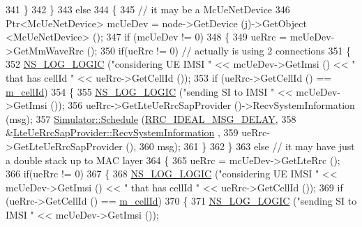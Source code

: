 \begin{DoxyCode}
341           \}             
342         \}
343         \textcolor{keywordflow}{else}
344         \{
345           \textcolor{comment}{// it may be a McUeNetDevice}
346           Ptr<McUeNetDevice> mcUeDev = node->GetDevice (j)->GetObject <McUeNetDevice> ();
347           \textcolor{keywordflow}{if} (mcUeDev != 0)
348           \{
349             ueRrc = mcUeDev->GetMmWaveRrc ();
350             \textcolor{keywordflow}{if}(ueRrc != 0) \textcolor{comment}{// actually is using 2 connections}
351             \{
352               \hyperlink{group__logging_ga88acd260151caf2db9c0fc84997f45ce}{NS\_LOG\_LOGIC} (\textcolor{stringliteral}{"considering UE IMSI "} << mcUeDev->GetImsi () << \textcolor{stringliteral}{" that has cellId 
      "} << ueRrc->GetCellId ());
353               \textcolor{keywordflow}{if} (ueRrc->GetCellId () == \hyperlink{classns3_1_1MmWaveEnbRrcProtocolIdeal_a12f3d627baf0e8dfe3b83ce9fcf7a2f3}{m\_cellId})
354               \{
355                 \hyperlink{group__logging_ga88acd260151caf2db9c0fc84997f45ce}{NS\_LOG\_LOGIC} (\textcolor{stringliteral}{"sending SI to IMSI "} << mcUeDev->GetImsi ());
356                 ueRrc->GetLteUeRrcSapProvider ()->RecvSystemInformation (msg);
357                 \hyperlink{classns3_1_1Simulator_a671882c894a08af4a5e91181bf1eec13}{Simulator::Schedule} (\hyperlink{namespacens3_a491c1ae41d0f077411ab2b4e7ba7eca7}{RRC\_IDEAL\_MSG\_DELAY}, 
358                                      &\hyperlink{classns3_1_1LteUeRrcSapProvider_a34d16c5adabf7ee0caf111fd2b6bfbd3}{LteUeRrcSapProvider::RecvSystemInformation}
      ,
359                                      ueRrc->GetLteUeRrcSapProvider (), 
360                                      msg);          
361               \}
362             \}
363             \textcolor{keywordflow}{else} \textcolor{comment}{// it may have just a double stack up to MAC layer}
364             \{
365               ueRrc = mcUeDev->GetLteRrc ();
366               \textcolor{keywordflow}{if}(ueRrc != 0) 
367               \{
368                 \hyperlink{group__logging_ga88acd260151caf2db9c0fc84997f45ce}{NS\_LOG\_LOGIC} (\textcolor{stringliteral}{"considering UE IMSI "} << mcUeDev->GetImsi () << \textcolor{stringliteral}{" that has
       cellId "} << ueRrc->GetCellId ());
369                 \textcolor{keywordflow}{if} (ueRrc->GetCellId () == \hyperlink{classns3_1_1MmWaveEnbRrcProtocolIdeal_a12f3d627baf0e8dfe3b83ce9fcf7a2f3}{m\_cellId})
370                 \{
371                   \hyperlink{group__logging_ga88acd260151caf2db9c0fc84997f45ce}{NS\_LOG\_LOGIC} (\textcolor{stringliteral}{"sending SI to IMSI "} << mcUeDev->GetImsi ());

\end{DoxyCode}
